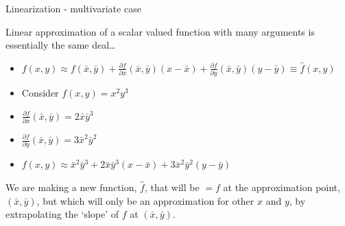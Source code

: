 \begin{frame}{Linearization - multivariate case}

Linear approximation of a scalar valued function with many arguments is essentially the same deal\ldots
\begin{itemize}
\item	$f(x,y) \approx f(\bar{x},\bar{y}) + \frac{\partial f}{\partial x}(\bar{x},\bar{y})(x-\bar{x}) + \frac{\partial f}{\partial y}(\bar{x},\bar{y})(y-\bar{y})\equiv \hat{f}(x,y)$
\end{itemize}

\begin{itemize}
\item	Consider $f(x,y) = x^{2} y^{3}$
\item	$\frac{\partial f}{\partial x}(\bar{x},\bar{y}) = 2\bar{x}\bar{y}^{3}$
\item	$\frac{\partial f}{\partial y}(\bar{x},\bar{y}) = 3\bar{x}^{2}\bar{y}^{2}$
\item	$f(x,y) \approx \bar{x}^{2} \bar{y}^{3} +  2\bar{x}\bar{y}^{3}(x-\bar{x}) + 3\bar{x}^{2}\bar{y}^{2}(y-\bar{y})$
\end{itemize}

\vspace{2mm}
We are making a new function, $\hat{f}$, that will be $=f$ at the approximation point, $(\bar{x},\bar{y})$, but which will only be an approximation for other $x$ and $y$, by extrapolating the `slope' of $f$ at $(\bar{x},\bar{y})$.

\end{frame}



